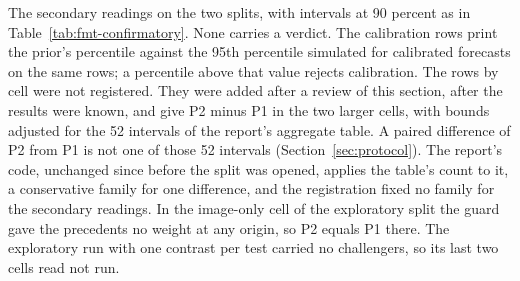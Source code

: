 \begin{table}[t]\centering\footnotesize
\caption{The secondary readings on the two splits, with intervals at 90 percent as in Table~\ref{tab:fmt-confirmatory}. None carries a verdict. The calibration rows print the prior's percentile against the 95th percentile simulated for calibrated forecasts on the same rows; a percentile above that value rejects calibration. The rows by cell were not registered. They were added after a review of this section, after the results were known, and give P2 minus P1 in the two larger cells, with bounds adjusted for the 52 intervals of the report's aggregate table. A paired difference of P2 from P1 is not one of those 52 intervals (Section~\ref{sec:protocol}). The report's code, unchanged since before the split was opened, applies the table's count to it, a conservative family for one difference, and the registration fixed no family for the secondary readings. In the image-only cell of the exploratory split the guard gave the precedents no weight at any origin, so P2 equals P1 there. The exploratory run with one contrast per test carried no challengers, so its last two cells read not run.}
\label{tab:fmt-confirmatory-secondary}

\end{table}

